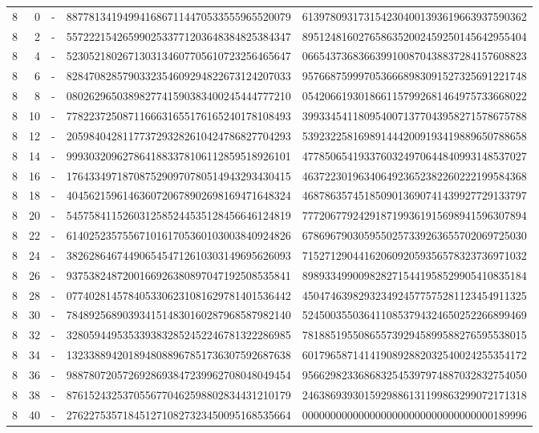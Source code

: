 \begin{longtable}{rrrll}
8 & 0 & - & 8877813419499416867114470533555965520079 & 6139780931731542304001393619663937590362 \\
8 & 2 & - & 5572221542659902533771203648384825384347 & 8951248160276586352002459250145642955404 \\
8 & 4 & - & 5230521802671303134607705610723256465647 & 0665437368366399100870438837284157608823 \\
8 & 6 & - & 8284708285790332354609294822673124207033 & 9576687599970536668983091527325691221748 \\
8 & 8 & - & 0802629650389827741590383400245444777210 & 0542066193018661157992681464975733668022 \\
8 & 10 & - & 7782237250871166631655176165240178108493 & 3993345411809540071377043958271578675788 \\
8 & 12 & - & 2059840428117737293282610424786827704293 & 5392322581698914442009193419889650788658 \\
8 & 14 & - & 9993032096278641883378106112859518926101 & 4778506541933760324970644840993148537027 \\
8 & 16 & - & 1764334971870875290970780514943293430415 & 4637223019634064923652382260222199584368 \\
8 & 18 & - & 4045621596146360720678902698169471648324 & 4687863574518509013690741439927729133797 \\
8 & 20 & - & 5457584115260312585244535128456646124819 & 7772067792429187199361915698941596307894 \\
8 & 22 & - & 6140252357556710161705360103003840924826 & 6786967903059550257339263655702069725030 \\
8 & 24 & - & 3826286467449065454712610303149695626093 & 7152712904416206092059356578323736971032 \\
8 & 26 & - & 9375382487200166926380897047192508535841 & 8989334990098282715441958529905410835184 \\
8 & 28 & - & 0774028145784053306231081629781401536442 & 4504746398293234924577575281123454911325 \\
8 & 30 & - & 7848925689039341514830160287968587982140 & 5245003550364110853794324650252266899469 \\
8 & 32 & - & 3280594495353393832852452246781322286985 & 7818851955086557392945899588276595538015 \\
8 & 34 & - & 1323388942018948088967851736307592687638 & 6017965871414190892882032540024255354172 \\
8 & 36 & - & 9887807205726928693847239962708048049454 & 9566298233686832545397974887032832754050 \\
8 & 38 & - & 8761524325370556770462598802834431210179 & 2463869393015929886131199863299072171318 \\
8 & 40 & - & 2762275357184512710827323450095168535664 & 0000000000000000000000000000000000189996 \\
\end{longtable}
